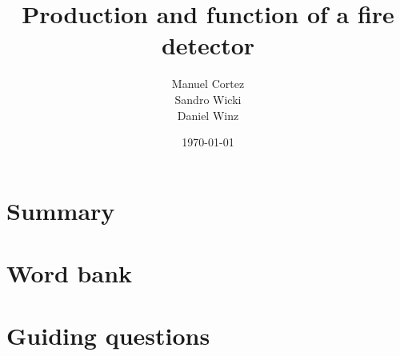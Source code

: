 \documentclass[a4paper]{article}
\title{Production and function of a fire detector}
\author{Manuel Cortez\\Sandro Wicki\\Daniel Winz}
\date{\today}
\begin{document}
\maketitle

\section{Summary}


\section{Word bank}


\section{Guiding questions}


\nocite{*}

\end{document}

